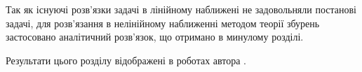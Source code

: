 Так як існуючі розв’язки задачі в лінійному наближені не задовольняли постанові 
задачі, для розв'язання в нелінійному наближенні методом теорії збурень
застосовано аналітичний розв'язок, що отримано в минулому розділі.


%

Результати цього розділу відображені в роботах автора 
\cite{my:Vesnik2015, my:Vesnik2017, my:Vesnik2017-2, my:MMET2014,
my:UWBUSIS2014, my:ICATT2015, my:UWBUSIS2016, my:KPI2016, my:DIPED2019}.
